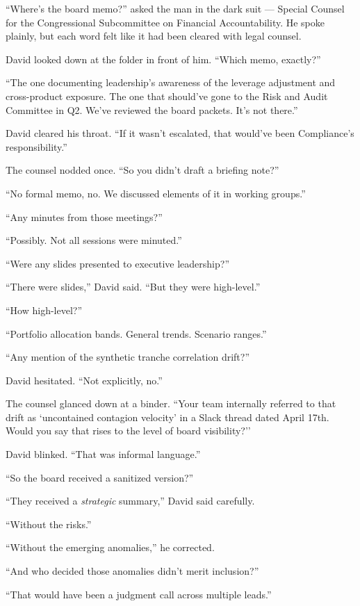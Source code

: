 ``Where’s the board memo?'' asked the man in the dark suit — Special Counsel for the Congressional 
Subcommittee on Financial Accountability. He spoke plainly, but each word felt like it had been 
cleared with legal counsel.

David looked down at the folder in front of him. ``Which memo, exactly?''

``The one documenting leadership’s awareness of the leverage adjustment and cross-product exposure. 
The one that should’ve gone to the Risk and Audit Committee in Q2. We’ve reviewed the board packets. 
It’s not there.''

David cleared his throat. ``If it wasn’t escalated, that would’ve been Compliance’s responsibility.''

The counsel nodded once. ``So you didn’t draft a briefing note?''

``No formal memo, no. We discussed elements of it in working groups.''

``Any minutes from those meetings?''

``Possibly. Not all sessions were minuted.''

``Were any slides presented to executive leadership?''

``There were slides,'' David said. ``But they were high-level.''

``How high-level?''

``Portfolio allocation bands. General trends. Scenario ranges.''

``Any mention of the synthetic tranche correlation drift?''

David hesitated. ``Not explicitly, no.''

The counsel glanced down at a binder. ``Your team internally referred to that drift as 
`uncontained contagion velocity’ in a Slack thread dated April 17th. Would you say that rises 
to the level of board visibility?''

David blinked. ``That was informal language.''

``So the board received a sanitized version?''

``They received a \textit{strategic} summary,'' David said carefully.

``Without the risks.''

``Without the emerging anomalies,'' he corrected.

``And who decided those anomalies didn’t merit inclusion?''

``That would have been a judgment call across multiple leads.''

